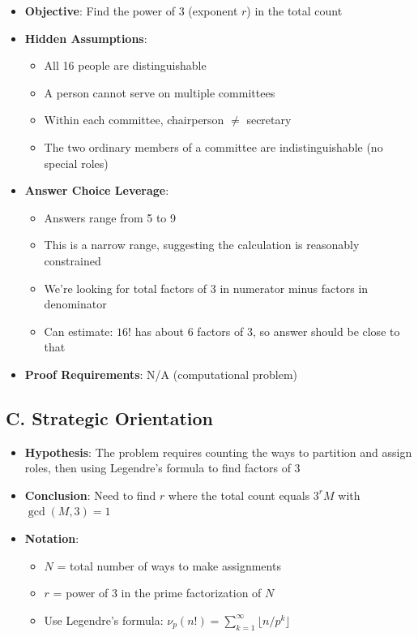 \documentclass[12pt]{article}
\begin{document}
\begin{problemconfigbox}
\begin{itemize}[leftmargin=*]
    \item \textbf{Objective}: Find the power of 3 (exponent $r$) in the total count
    
    \item \textbf{Hidden Assumptions}: 
    \begin{itemize}
        \item All 16 people are distinguishable
        \item A person cannot serve on multiple committees
        \item Within each committee, chairperson $\neq$ secretary
        \item The two ordinary members of a committee are indistinguishable (no special roles)
    \end{itemize}
    
    \item \textbf{Answer Choice Leverage}: 
    \begin{itemize}
        \item Answers range from 5 to 9
        \item This is a narrow range, suggesting the calculation is reasonably constrained
        \item We're looking for total factors of 3 in numerator minus factors in denominator
        \item Can estimate: $16!$ has about 6 factors of 3, so answer should be close to that
    \end{itemize}
    
    \item \textbf{Proof Requirements}: N/A (computational problem)
\end{itemize}

\subsection*{C. Strategic Orientation}
\begin{itemize}[leftmargin=*]
    \item \textbf{Hypothesis}: The problem requires counting the ways to partition and assign roles, then using Legendre's formula to find factors of 3
    
    \item \textbf{Conclusion}: Need to find $r$ where the total count equals $3^r M$ with $\gcd(M,3)=1$
    
    \item \textbf{Notation}: 
    \begin{itemize}
        \item $N$ = total number of ways to make assignments
        \item $r$ = power of 3 in the prime factorization of $N$
        \item Use Legendre's formula: $\nu_p(n!) = \sum_{k=1}^{\infty} \lfloor n/p^k \rfloor$
    \end{itemize}
    

\end{itemize}
\end{problemconfigbox}
\end{document}
